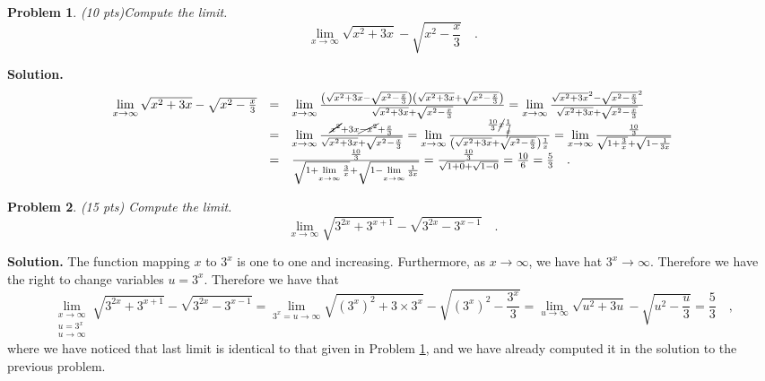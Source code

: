 \documentclass{article}
\newtheorem{problem}{Problem}
\begin{document}
\begin{problem} (10 pts)\label{probProblem8Test1}
Compute the limit.
\[\lim\limits_{x\to\infty}\sqrt{x^2+3x}-\sqrt{x^2-\frac{x}3}\quad .
\]
\end{problem}
\textbf{Solution. }
\[
\begin{array}{rcl}
\lim\limits_{x\to\infty}\sqrt{x^2+3x}-\sqrt{x^2-\frac{x}3} &=&
\lim\limits_{x\to\infty}\frac{\left(\sqrt{x^2+3x}-\sqrt{x^2-\frac{x}3}\right)\left(\sqrt{x^2+3x}+\sqrt{x^2-\frac{x}3}\right)}{\sqrt{x^2+3x}+\sqrt{x^2-\frac{x}3}}=\lim\limits_{x\to\infty} \frac{\sqrt{x^2+3x}^2-\sqrt{x^2-\frac{x}3}^2 }{\sqrt{x^2+3x}+\sqrt{x^2-\frac{x}3}}\\
&=& \lim\limits_{x\to\infty} \frac{ \cancel{x^2}+3x\cancel{-x^2}+\frac{x}{3} }{\sqrt{x^2+3x}+\sqrt{x^2-\frac{x}3}}=\lim\limits_{x\to \infty} \frac{\frac{10}3\cancel{x} \frac{1}{\cancel{x}}}{\left( \sqrt{x^2+3x}+\sqrt{x^2-\frac{x}3}\right) \frac{1}x } =
\lim\limits_{x\to \infty} \frac{\frac{10}3}{\sqrt{1+\frac{3}{x}}+\sqrt{1-\frac{1}{3x}}}\\
&=&\frac{\frac{10}3}{\sqrt{1+\lim\limits_{x\to \infty}\frac{3}x}+ \sqrt{1-\lim\limits_{x\to \infty}\frac{1}{3x}}}= \frac{\frac{10}{3}}{\sqrt{1+0}+\sqrt{1-0}}= \frac{10}6= \frac{5}3\quad .
\end{array}
\]

\begin{problem} (15 pts)
Compute the limit.
\[
\lim_{x\to \infty} \sqrt{ 3^{2x}+3^{x+1}}-\sqrt{3^{2x}-3^{x-1}}\quad .
\]
\end{problem}
\textbf{Solution. } The function mapping $x$ to $3^x$ is one to one and increasing.  Furthermore, as $x\to \infty$, we have hat $3^x\to \infty$. Therefore we have the right to change variables $u=3^x$. Therefore we have that
\[
\lim\limits_{\substack{x\to \infty \\ u=3^x \\ u\to \infty}} \sqrt{ 3^{2x}+3^{x+1}}-\sqrt{3^{2x}-3^{x-1}} = \lim\limits_{ 3^x=u\to \infty}  \sqrt{ (3^{x})^2+3\times 3^{x}}-\sqrt{(3^{x})^2-\frac{3^{x}}{3}}= \lim \limits_{u\to \infty} \sqrt{ u^2+3u}-\sqrt{u^2-\frac{u}{3}}= \frac{5}{3}\quad,
\]
where we have noticed that last limit is identical to that given in Problem \ref{probProblem8Test1}, and we have already computed it in the solution to the previous problem.
\end{document}
